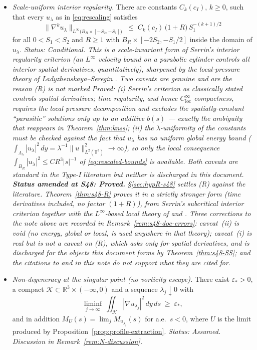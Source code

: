 \documentclass[11pt]{article}
\theoremstyle{definition}
\theoremstyle{remark}
\newcommand{\R}{\mathbb{R}}
\newcommand{\T}{\mathbb{T}}
\begin{document}
\begin{itemize}
\item[\textbf{(R)}] \emph{Scale-uniform interior regularity.}
  There are constants $C_k(c_I)$, $k\geq 0$, such that every $u_\lambda$
  as in \eqref{eq:rescaling} satisfies
  \[
    \bigl\|\nabla^k u_\lambda\bigr\|_{L^\infty\bigl(B_R\times[-S_2,-S_1]\bigr)}
    \;\leq\; C_k(c_I)\,\bigl(1+R\bigr)\,S_1^{-(k+1)/2}
  \]
  for all $0<S_1<S_2$ and $R\geq1$ with $B_R\times[-2S_2,-S_1/2]$ inside the
  domain of $u_\lambda$.
  \emph{Status: Conditional. This is a scale-invariant form of Serrin's
  interior regularity criterion \cite{Serrin1962} (an $L^\infty$ velocity
  bound on a parabolic cylinder controls all interior spatial derivatives,
  quantitatively), sharpened by the local-pressure theory of
  Ladyzhenskaya--Seregin \cite{LadyzhenskayaSeregin1999}. Two caveats are
  genuine and are the reason (R) is not marked Proved: (i) Serrin's criterion
  as classically stated controls spatial derivatives; time regularity, and
  hence $C^\infty_{\mathrm{loc}}$ compactness, requires the local pressure
  decomposition and excludes the spatially-constant ``parasitic'' solutions
  only up to an additive $b(s)$ --- exactly the ambiguity that reappears in
  Theorem~\ref{thm:knss}; (ii) the $\lambda$-uniformity of the constants must
  be checked against the fact that $u_\lambda$ has \emph{no} uniform global
  energy bound ($\int_{\Lambda_\lambda}|u_\lambda|^2\,dy
  = \lambda^{-1}\|u\|_{L^2(\T^3)}^2\to\infty$), so only the local
  consequence $\int_{B_R}|u_\lambda|^2 \leq C R^3 |s|^{-1}$
  of \eqref{eq:rescaled-bounds} is available. Both caveats are standard in the
  Type-I literature \cite{Seregin2012} but neither is discharged in this
  document.}
  \emph{\textbf{Status amended at S48: Proved.} \S\ref{sec:hypR-s48} settles
  \textup{(R)} against the literature. Theorem~\ref{thm:s48-R} proves it in a
  strictly stronger form (time derivatives included, no factor $(1+R)$), from
  Serrin's \emph{subcritical} interior criterion
  \cite{Serrin1962,ChenGaldiPoggiSchikorra2026} together with the
  $L^\infty$-based local theory of \cite[\S4]{KNSS2009} and
  \cite[Thm.~2.4]{SereginSverak2009}. Three corrections to the note above are
  recorded in Remark~\ref{rem:s48-doc-errors}: caveat~(ii) is void (no energy,
  global or local, is used anywhere in that theory); caveat~(i) is real but is
  not a caveat on \textup{(R)}, which asks only for spatial derivatives, and
  is discharged for the objects this document forms by
  Theorem~\ref{thm:s48-SS}; and the citations to \cite{Seregin2012} and
  \cite{LadyzhenskayaSeregin1999} in this note do not support what they are
  cited for.}
\item[\textbf{(N)}] \emph{Non-degeneracy at the singular point (no vorticity
  escape).}
  There exist $\varepsilon_*>0$, a compact
  $\mathcal{K}\subset\R^3\times(-\infty,0)$ and a sequence
  $\lambda_j\downarrow0$ with
  \[
    \liminf_{j\to\infty}\ \iint_{\mathcal{K}}|\nabla u_{\lambda_j}|^2\,dy\,ds
    \;\geq\;\varepsilon_* ,
  \]
  and in addition $M_{U}(s) = \lim_j M_{u_{\lambda_j}}(s)$ for a.e.\ $s<0$,
  where $U$ is the limit produced by
  Proposition~\ref{prop:profile-extraction}.
  \emph{Status: Assumed. Discussion in Remark~\ref{rem:N-discussion}.}
\end{itemize}
\end{document}
